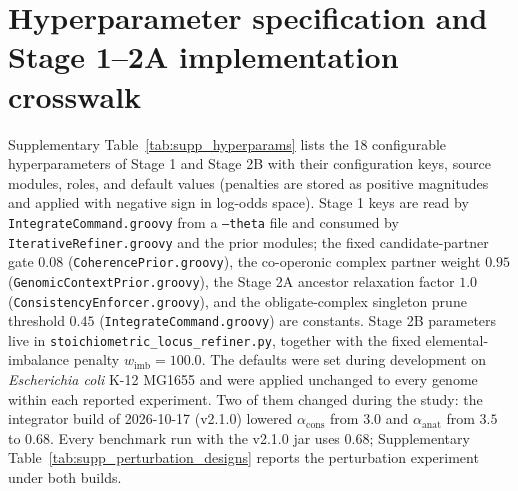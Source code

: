 \documentclass[10pt]{article}
\newcommand{\fn}[1]{\nolinkurl{#1}}
\begin{document}
\section{Hyperparameter specification and Stage 1--2A implementation crosswalk}
\label{sec:supp_hyperparams}

Supplementary Table~\ref{tab:supp_hyperparams} lists the 18 configurable hyperparameters of Stage 1 and Stage 2B with their configuration keys, source modules, roles, and default values (penalties are stored as positive magnitudes and applied with negative sign in log-odds space). Stage 1 keys are read by \fn{IntegrateCommand.groovy} from a \texttt{--theta} file and consumed by \fn{IterativeRefiner.groovy} and the prior modules; the fixed candidate-partner gate $0.08$ (\fn{CoherencePrior.groovy}), the co-operonic complex partner weight $0.95$ (\fn{GenomicContextPrior.groovy}), the Stage 2A ancestor relaxation factor $1.0$ (\fn{ConsistencyEnforcer.groovy}), and the obligate-complex singleton prune threshold $0.45$ (\fn{IntegrateCommand.groovy}) are constants. Stage 2B parameters live in \fn{stoichiometric_locus_refiner.py}, together with the fixed elemental-imbalance penalty $w_{\text{imb}} = 100.0$. The defaults were set during development on \textit{Escherichia coli} K-12 MG1655 and were applied unchanged to every genome within each reported experiment. Two of them changed during the study: the integrator build of 2026-10-17 (v2.1.0) lowered $\alpha_{\text{cons}}$ from $3.0$ and $\alpha_{\text{anat}}$ from $3.5$ to $0.68$. Every benchmark run with the v2.1.0 jar uses $0.68$; Supplementary Table~\ref{tab:supp_perturbation_designs} reports the perturbation experiment under both builds.
\end{document}
